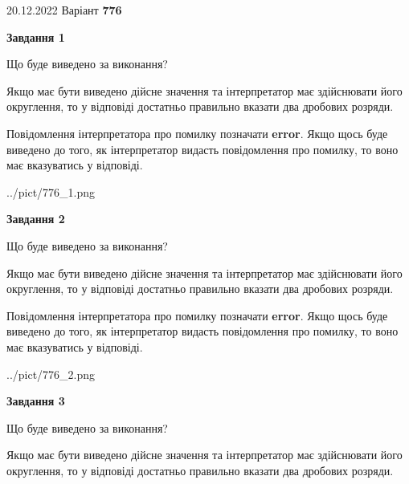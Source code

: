 \documentclass[12pt, ukrainian]{article}
\begin{document}
{20.12.2022 Варіант \No \textbf { 776 }\par}
{
\begin {Large}

{\begin {center}\textbf{Завдання 1}\end {center}}\par
Що буде виведено за виконання? \par

Якщо має бути виведено дійсне значення та інтерпретатор має здійснювати його округлення, 
то у відповіді достатньо правильно вказати два дробових розряди.

Повідомлення інтерпретатора про помилку позначати \textbf{error}.
Якщо щось буде виведено до того, як інтерпретатор видасть повідомлення про помилку, 
то воно має вказуватись у відповіді. \par

\begin{center}
	{../pict/776_1.png}
\end{center}
\newpage

{\begin {center}\textbf{Завдання 2}\end {center}}\par
Що буде виведено за виконання? \par

Якщо має бути виведено дійсне значення та інтерпретатор має здійснювати його округлення, 
то у відповіді достатньо правильно вказати два дробових розряди.

Повідомлення інтерпретатора про помилку позначати \textbf{error}.
Якщо щось буде виведено до того, як інтерпретатор видасть повідомлення про помилку, 
то воно має вказуватись у відповіді. \par

\begin{center}
	{../pict/776_2.png}
\end{center}
\newpage

{\begin {center}\textbf{Завдання 3}\end {center}}\par
Що буде виведено за виконання? \par

Якщо має бути виведено дійсне значення та інтерпретатор має здійснювати його округлення, 
то у відповіді достатньо правильно вказати два дробових розряди.


\end{Large}}
\end{document}
